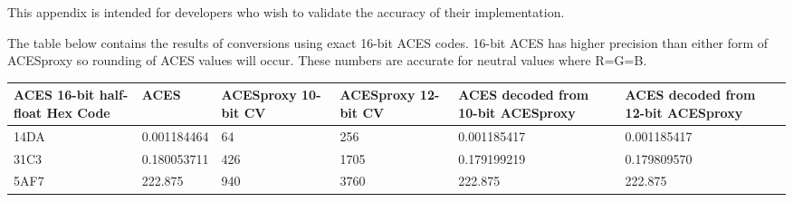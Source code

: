 \label{appendixB}

This appendix is intended for developers who wish to validate the accuracy of their implementation.

The table below contains the results of conversions using exact 16-bit ACES codes. 16-bit ACES has higher precision than either form of ACESproxy so rounding of ACES values will occur. These numbers are accurate for neutral values where R=G=B.

\begin{center}
\begin{tabularx}{\textwidth}{|Y|Y|Y|Y|Y|Y|}
\hline
\textbf{ACES 16-bit half-float Hex Code} & \textbf{ACES} & \textbf{ACESproxy 10-bit CV} & 
\textbf{ACESproxy 12-bit CV} & \textbf{ACES decoded from 10-bit ACESproxy} & \textbf{ACES decoded from 12-bit ACESproxy} \\ \hline
14DA & 0.001184464 & 64 & 256 & 0.001185417 & 0.001185417 \\ \hline
31C3 & 0.180053711 & 426 & 1705 & 0.179199219 & 0.179809570 \\ \hline
5AF7 & 222.875 & 940 & 3760 & 222.875 & 222.875 \\ \hline
\end{tabularx}
\end{center}

